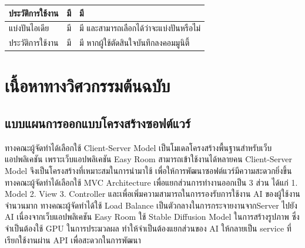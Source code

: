 \documentclass[12pt,oneside,openright,a4paper]{cpe-thai-project}
\begin{document}
\begin{enumerate}
\begin{table}[!h]
\begin{tabular}{|p{4cm}|p{5cm}|p{5cm}|}
            \hline
            ประวัติการใช้งาน                                                                                   & มี                                                                                                                                  & มี                               \\
            \hline
            แบ่งปันไอเดีย                                                                                      & มี                                                                                                                                  & มี และสามารถเลือกได้ว่าจะแบ่งปันหรือไม่ \\
            \hline
            ประวัติการใช้งาน                                                                                   & มี                                                                                                                                  & มี หากผู้ใช้ตัดสินใจบันทึกลงคอมมูนิตี้      \\
            \hline
          \end{tabular}
        \end{table}

\end{enumerate}

\vspace{\fill}\clearpage

\section{เนื้อหาทางวิศวกรรมต้นฉบับ}

\subsection{แบบแผนการออกแบบโครงสร้างซอฟต์แวร์}
\hspace {18pt}ทางคณะผู้จัดทำได้เลือกใช้ Client-Server Model เป็นโมเดลโครงสร้างพื้นฐานสำหรับเว็บแอปพลิเคชัน เพราะเว็บแอปพลิเคชัน Easy Room สามารถเข้าใช้งานได้หลายคน Client-Server Model จึงเป็นโครงสร้างที่เหมาะสมในการนำมาใช้ \cite{client}  เพื่อให้การพัฒนาซอฟต์แวร์มีความสะดวกยิ่งขึ้น ทางคณะผู้จัดทำได้เลือกใช้ MVC Architecture \cite{mvc} เพื่อแยกส่วนการทำงานออกเป็น 3 ส่วน ได้แก่ 1. Model 2. View 3. Controller และเพื่อเพิ่มความสามารถในการรองรับการใช้งาน AI ของผู้ใช้งานจำนวนมาก ทางคณะผู้จัดทำได้ใช้ Load Balance \cite{loadBalancer}เป็นตัวกลางในการกระจายงานจากServer ไปยัง AI เนื่องจากเว็บแอปพลิเคชัน Easy Room ใช้ Stable Diffusion Model ในการสร้างรูปภาพ ซึ่งจำเป็นต้องใช้ GPU \cite{pcsystem} ในการประมวลผล ทำให้จำเป็นต้องแยกส่วนของ AI ให้กลายเป็น service ที่เรียกใช้งานผ่าน API เพื่อสะดวกในการพัฒนา
\end{document}
